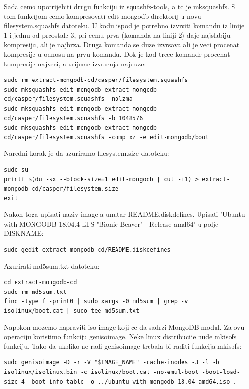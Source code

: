 \documentclass[12pt,vi]{mitthesis}
\begin{document}
\noindent
Sada cemo upotrijebiti drugu funkciju iz squashfs-tools, a to je mksquashfs. S tom funkcijom cemo kompresovati edit-mongodb direktorij u novu filesystem.squashfs datoteku. U kodu ispod je potrebno izvrsiti komandu iz linije 1 i jednu od preostale 3, pri cemu prva (komanda na liniji 2) daje najslabiju kompresiju, ali je najbrza. Druga komanda se duze izvrsava ali je veci procenat kompresije u odnosu na prvu komandu. Dok je kod trece komande procenat kompresije najveci, a vrijeme izvrsenja najduze:
\begin{lstlisting}[style=BashInputStyle]
sudo rm extract-mongodb-cd/casper/filesystem.squashfs
sudo mksquashfs edit-mongodb extract-mongodb-cd/casper/filesystem.squashfs -nolzma 
sudo mksquashfs edit-mongodb extract-mongodb-cd/casper/filesystem.squashfs -b 1048576
sudo mksquashfs edit-mongodb extract-mongodb-cd/casper/filesystem.squashfs -comp xz -e edit-mongodb/boot
\end{lstlisting}

\noindent
Naredni korak je da azuriramo filesystem.size datoteku:
\begin{lstlisting}[style=BashInputStyle]
sudo su
printf $(du -sx --block-size=1 edit-mongodb | cut -f1) > extract-mongodb-cd/casper/filesystem.size
exit
\end{lstlisting}

\noindent
Nakon toga upisati naziv image-a unutar README.diskdefines. 
Upisati 'Ubuntu with MONGODB 18.04.4 LTS "Bionic Beaver" - Release amd64' u polje DISKNAME:
\begin{lstlisting}[style=BashInputStyle]
sudo gedit extract-mongodb-cd/README.diskdefines
\end{lstlisting}

\noindent
Azurirati md5sum.txt datoteku:
\begin{lstlisting}[style=BashInputStyle]
cd extract-mongodb-cd
sudo rm md5sum.txt
find -type f -print0 | sudo xargs -0 md5sum | grep -v isolinux/boot.cat | sudo tee md5sum.txt
\end{lstlisting}

\noindent
Napokon mozemo napraviti iso image koji ce da sadrzi MongoDB modul. Za ovu operaciju koristimo funkciju genisoimage. Neke linux distribucije nude mkisofs funkciju. Tako da ukoliko ne radi genisoimage trebala bi raditi funkcija mkisofs:
\begin{lstlisting}[style=BashInputStyle]
sudo genisoimage -D -r -V "$IMAGE_NAME" -cache-inodes -J -l -b isolinux/isolinux.bin -c isolinux/boot.cat -no-emul-boot -boot-load-size 4 -boot-info-table -o ../ubuntu-with-mongodb-18.04-amd64.iso .
\end{lstlisting}
\end{document}
